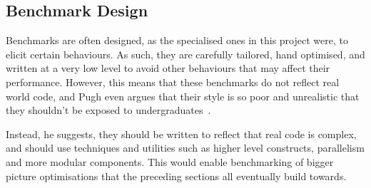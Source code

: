 \subsection{Benchmark Design}

Benchmarks are often designed, as the specialised ones in this project were, to elicit certain behaviours. As such, they are carefully tailored, hand optimised, and written at a very low level to avoid other behaviours that may affect their performance. However, this means that these benchmarks do not reflect real world code, and Pugh even argues that their style is so poor and unrealistic that they shouldn't be exposed to undergraduates~\cite{optimisationrelevant}.

Instead, he suggests, they should be written to reflect that real code is complex, and should use techniques and utilities such as higher level constructs, parallelism and more modular components. This would enable benchmarking of bigger picture optimisations that the preceding sections all eventually build towards.
